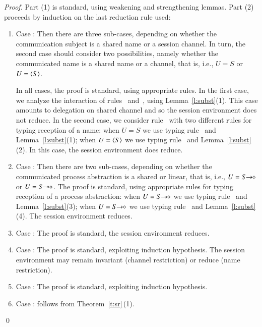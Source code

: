 \begin{proof}
Part (1) is standard, using weakening and strengthening lemmas. Part (2) proceeds by induction on the last reduction rule used:
\begin{enumerate}[$-$]
\item Case : Then there are three sub-cases, depending on whether the 
communication subject is a shared name or a session channel. In turn, the second case should consider two possibilities, namely whether the communicated name is a shared name or a channel, that is, i.e., $U = S$ or $U = \langle S \rangle$. 

In all cases, the proof is standard, using appropriate rules.
In the first case, we analyze the interaction of rules~ and~, 
using Lemma~\ref{l:subst}(1).
This case amounts to delegation on shared channel and so the session environment does not reduce.
In the second case, we consider rule~ with two different rules 
 for typing reception of a name: when $U = S$ we use typing 
rule~ and Lemma~\ref{l:subst}(1); when $U = \langle S \rangle$ we use typing 
rule~ and Lemma~\ref{l:subst}(2). In this case, the session environment does reduce.

\item Case : Then there are two sub-cases, depending on whether the communicated process abstraction is a shared or linear, that is, i.e., $U = S\!\! \rightarrow\!\! \diamond$ or $U = S\!\! \multimap\!\! \diamond$. The proof is standard, using appropriate rules for typing reception of a process abstraction: 
when $U = S\!\! \multimap\!\! \diamond$ we use typing rule~ and Lemma~\ref{l:subst}(3); 
when $U = S\!\! \rightarrow\!\! \diamond$ we use typing rule~ and Lemma~\ref{l:subst}(4). The session environment reduces.

\item Case : The proof is standard, the session environment reduces.

\item Case :  The proof is standard, exploiting induction hypothesis. The session environment may remain invariant (channel restriction)  or reduce (name restriction).

\item Case :
The proof is standard, exploiting induction hypothesis. 

\item Case : follows from Theorem~\ref{t:sr}\,(1).



\end{enumerate}
\qed
\end{proof}
